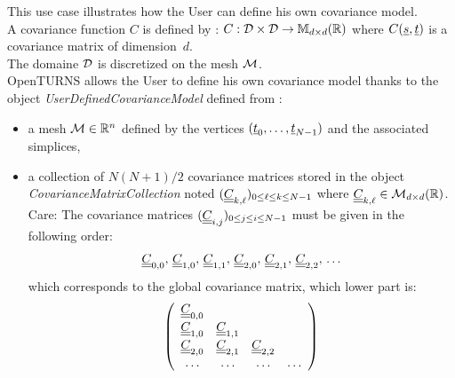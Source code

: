 \renewcommand{\filename}{docUC_StocProc_NonStationaryCovarianceFunction_UserDefined.tex}
\renewcommand{\filetitle}{UC : Creation of a User defined covariance function}

\HeaderIIILevel

\label{CovarianceModelCreation}

This use case illustrates how the User can define his own covariance model.\\

A covariance function $C$ is defined by : $C : {\mathcal D} \times {\mathcal D} \rightarrow \mathbb{M}_{d \times d}({\mathbb R})$ where $C({\underline{s}}, {\underline{t}})$ is a covariance matrix of dimension~$d$.\\
The domaine ${\mathcal D}$ is discretized on the mesh ${\mathcal M}$.\\


OpenTURNS allows the User to define his own covariance model thanks to the object {\itshape UserDefinedCovarianceModel} defined from :
\begin{itemize}
\item a mesh ${\mathcal M} \in {\mathbb R}^n$ defined by the vertices $({\underline{t}}_0,\dots, {\underline{t}}_{N-1})$ and the associated simplices,
\item a collection of $N(N+1)/2$ covariance matrices stored in the object \emph{CovarianceMatrixCollection} noted $({\underline{\underline{C}}}_{k,\ell})_{0 \leq \ell \leq k \leq N-1}$ where ${\underline{\underline{C}}}_{k,\ell} \in \mathcal{M}_{d \times d}({\mathbb R})$.\\

  Care: The covariance matrices $({\underline{\underline{C}}}_{i,j})_{0 \leq j \leq i \leq N-1}$ must be given in the following order:
  \begin{align*}
    {\underline{\underline{C}}}_{0,0}, \, {\underline{\underline{C}}}_{1, 0}, \, {\underline{\underline{C}}}_{1,1}, \, {\underline{\underline{C}}}_{2,0},  \,{\underline{\underline{C}}}_{2,1},\, {\underline{\underline{C}}}_{2,2}, \,\dots
  \end{align*}
  which corresponds to the global covariance matrix, which lower part is:
  \begin{align*}
    \left(
    \begin{array}{cccc}
      {\underline{\underline{C}}}_{0,0}& & & \\
      {\underline{\underline{C}}}_{1,0}&  {\underline{\underline{C}}}_{1,1}& & \\
      {\underline{\underline{C}}}_{2,0}&   {\underline{\underline{C}}}_{2,1}& {\underline{\underline{C}}}_{2,2}& \\
      \dots & \dots & \dots & \dots
    \end{array}
    \right)
  \end{align*}
\end{itemize}


